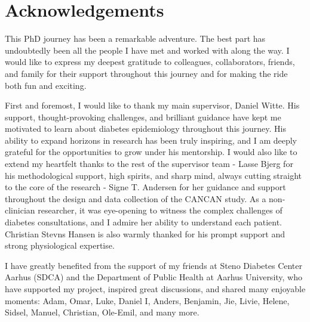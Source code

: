 \documentclass[
  a4paper,
  headsepline=true,
  open=left]{scrbook}
\begin{document}

\hypertarget{acknowledgements}{%
\chapter*{Acknowledgements}\label{acknowledgements}}


This PhD journey has been a remarkable adventure. The best part has
undoubtedly been all the people I have met and worked with along the
way. I would like to express my deepest gratitude to colleagues,
collaborators, friends, and family for their support throughout this
journey and for making the ride both fun and exciting.

First and foremost, I would like to thank my main supervisor, Daniel
Witte. His support, thought-provoking challenges, and brilliant guidance
have kept me motivated to learn about diabetes epidemiology throughout
this journey. His ability to expand horizons in research has been truly
inspiring, and I am deeply grateful for the opportunities to grow under
his mentorship. I would also like to extend my heartfelt thanks to the
rest of the supervisor team - Lasse Bjerg for his methodological
support, high spirits, and sharp mind, always cutting straight to the
core of the research - Signe T. Andersen for her guidance and support
throughout the design and data collection of the CANCAN study. As a
non-clinician researcher, it was eye-opening to witness the complex
challenges of diabetes consultations, and I admire her ability to
understand each patient. Christian Stevns Hansen is also warmly thanked
for his prompt support and strong physiological expertise.

I have greatly benefited from the support of my friends at Steno
Diabetes Center Aarhus (SDCA) and the Department of Public Health at
Aarhus University, who have supported my project, inspired great
discussions, and shared many enjoyable moments: Adam, Omar, Luke, Daniel
I, Anders, Benjamin, Jie, Livie, Helene, Sidsel, Manuel, Christian,
Ole-Emil, and many more.
\end{document}
